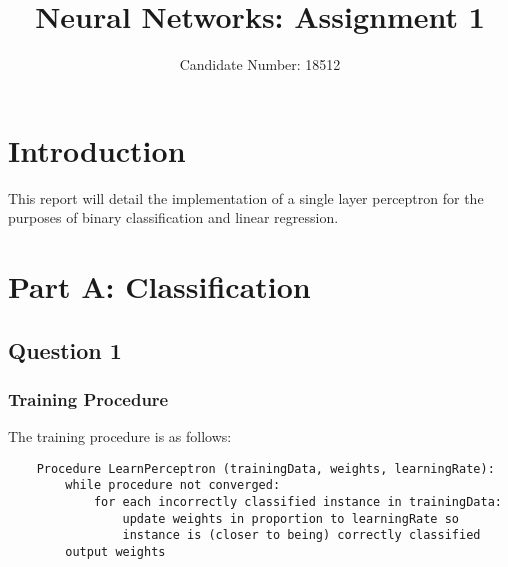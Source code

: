 \documentclass{article}
\title{Neural Networks: Assignment 1}
\author{Candidate Number: 18512}
\begin{document}
\maketitle

\section*{Introduction}
This report will detail the implementation of a single layer perceptron for the purposes of binary classification and linear regression.

\section*{Part A: Classification}
\subsection*{Question 1}
\subsubsection*{Training Procedure}
The training procedure is as follows:

\begin{verbatim}
    Procedure LearnPerceptron (trainingData, weights, learningRate):
        while procedure not converged:
            for each incorrectly classified instance in trainingData:
                update weights in proportion to learningRate so
                instance is (closer to being) correctly classified
        output weights
\end{verbatim}
\end{document}
